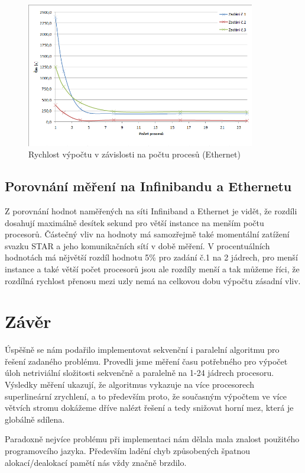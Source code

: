 \documentclass[12pt]{article}
\begin{document}
\begin{figure}[h]
\begin{center}
\includegraphics[width=100mm]{cpu_time_ethernet.png}
\caption{Rychlost výpočtu v závislosti na počtu procesů (Ethernet)}
\label{fig:ct_inifini}
\end{center}
\end{figure}


\subsection{Porovnání měření na Infinibandu a Ethernetu}
Z porovnání hodnot naměřených na síti Infiniband a Ethernet je vidět, že rozdíli
dosahují maximálně desítek sekund pro větší instance na menším počtu procesorů.
Částečný vliv na hodnoty má samozřejmě také momentální zatížení svazku STAR a
jeho komunikačních sítí v době měření. V procentuálních hodnotách má nějvětší
rozdíl hodnotu 5\% pro zadání č.1 na 2 jádrech, pro menší instance a také větší
počet procesorů jsou ale rozdíly menší a tak můžeme říci, že rozdílná rychlost
přenosu mezi uzly nemá na celkovou dobu výpočtu zásadní vliv.

\section{Závěr}

Úspěšně se nám podařilo implementovat sekvenční i paralelní algoritmu pro
řešení zadaného problému. Provedli jsme měření času potřebného pro výpočet úloh
netriviální složitosti sekvenčně a paralelně na 1-24 jádrech procesoru. Výsledky
měření ukazují, že algoritmus vykazuje na více procesorech superlineární
zrychlení, a to především proto, že současným  výpočtem ve více větvích stromu
dokážeme dříve nalézt  řešení a tedy snižovat horní mez, která je
globálně sdílena. 

Paradoxně nejvíce problému při implementaci nám dělala mala znalost použitého
programovcího jazyka. Především ladění chyb způsobených špatnou
alokací/dealokací pamětí nás vždy značně brzdilo.
\end{document}
